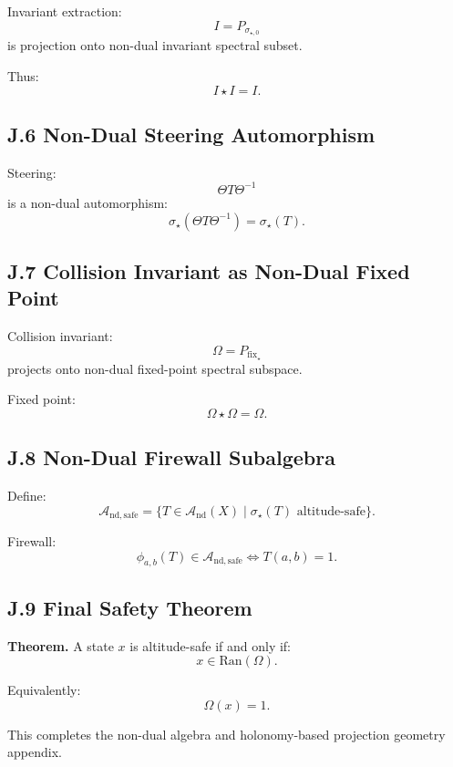 Invariant extraction:
\[
I = P_{\sigma_{\star,0}}
\]
is projection onto non-dual invariant spectral subset.

Thus:
\[
I \star I = I.
\]

\subsection*{J.6 Non-Dual Steering Automorphism}

Steering:
\[
\Theta T \Theta^{-1}
\]
is a non-dual automorphism:
\[
\sigma_{\star}(\Theta T \Theta^{-1}) = \sigma_{\star}(T).
\]

\subsection*{J.7 Collision Invariant as Non-Dual Fixed Point}

Collision invariant:
\[
\Omega = P_{\mathrm{fix}_{\star}}
\]
projects onto non-dual fixed-point spectral subspace.

Fixed point:
\[
\Omega \star \Omega = \Omega.
\]

\subsection*{J.8 Non-Dual Firewall Subalgebra}

Define:
\[
\mathcal{A}_{\mathrm{nd,safe}} =
\{ T \in \mathcal{A}_{\mathrm{nd}}(X) \mid
\sigma_{\star}(T) \text{ altitude-safe} \}.
\]

Firewall:
\[
\phi_{a,b}(T) \in \mathcal{A}_{\mathrm{nd,safe}}
\iff
T(a,b)=1.
\]

\subsection*{J.9 Final Safety Theorem}

\textbf{Theorem.}  
A state $x$ is altitude-safe if and only if:
\[
x \in \mathrm{Ran}(\Omega).
\]

Equivalently:
\[
\Omega(x)=1.
\]

This completes the non-dual algebra and holonomy-based projection geometry appendix.
